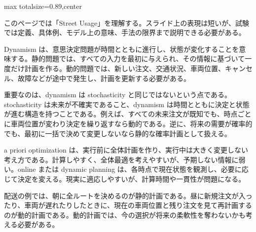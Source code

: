 \begin{minipage}[t]{0.58\textwidth}
\begin{adjustbox}{max totalsize={\textwidth}{0.89\textheight},center}
\begin{minipage}{\textwidth}\scriptsize
{}このページでは「Street Usage」を理解する。スライド上の表現は短いが、試験では定義、具体例、モデル上の意味、手法の限界まで説明できる必要がある。\par
Dynamism は、意思決定問題が時間とともに進行し、状態が変化することを意味する。静的問題では、すべての入力を最初に与えられ、その情報に基づいて一度だけ計画を作る。動的問題では、新しい注文、交通状況、車両位置、キャンセル、故障などが途中で発生し、計画を更新する必要がある。\par
重要なのは、dynamism は stochasticity と同じではないという点である。stochasticity は未来が不確実であること、dynamism は時間とともに決定と状態が進む構造を持つことである。例えば、すべての未来注文が既知でも、時点ごとに車両位置が変わり決定を繰り返すなら動的である。逆に、将来の需要が確率的でも、最初に一括で決めて変更しないなら静的な確率計画として扱える。\par
a priori optimization は、実行前に全体計画を作り、実行中は大きく変更しない考え方である。計算しやすく、全体最適を考えやすいが、予期しない情報に弱い。online または dynamic planning は、各時点で現在状態を観測し、必要に応じて決定を変える。現実に適応しやすいが、計算時間や一貫性が問題になる。\par
配送の例では、朝に全ルートを決めるのが静的計画である。昼に新規注文が入ったり、車両が遅れたりしたときに、現在の車両位置と残り注文を見て再計画するのが動的計画である。動的計画では、今の選択が将来の柔軟性を奪わないかも考える必要がある。\par

\end{minipage}
\end{adjustbox}
\end{minipage}
